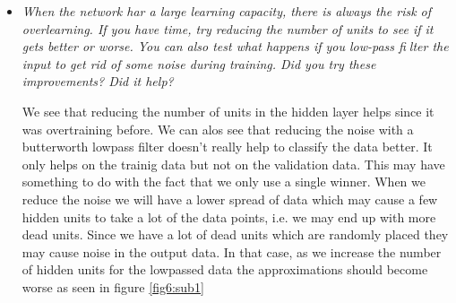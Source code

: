 \documentclass[a4paper,11pt]{article}
\begin{document}
\begin{itemize}

\item \textit{When the network har a large learning capacity, there is always the risk of overlearning. If you have time, try reducing the number of units to see if it gets better or worse. You can also test what happens if you low-pass filter the input to get rid of some noise during training. Did you try these improvements? Did it help?}

We see that reducing the number of units in the hidden layer helps since it was overtraining before. We can alos see that reducing the noise with a butterworth lowpass filter doesn't really help to classify the data better. It only helps on the trainig data but not on the validation data. This may have something to do with the fact that we only use a single winner. When we reduce the noise we will have a lower spread of data which may cause a few hidden units to take a lot of the data points, i.e. we may end up with more dead units. Since we have a lot of dead units which are randomly placed they may cause noise in the output data. In that case, as we increase the number of hidden units for the lowpassed data the approximations should become worse as seen in figure \ref{fig6:sub1}

\begin{figure}[h!]
\label{fig6}
\caption{}
\end{figure}

\end{itemize}
\end{document}
